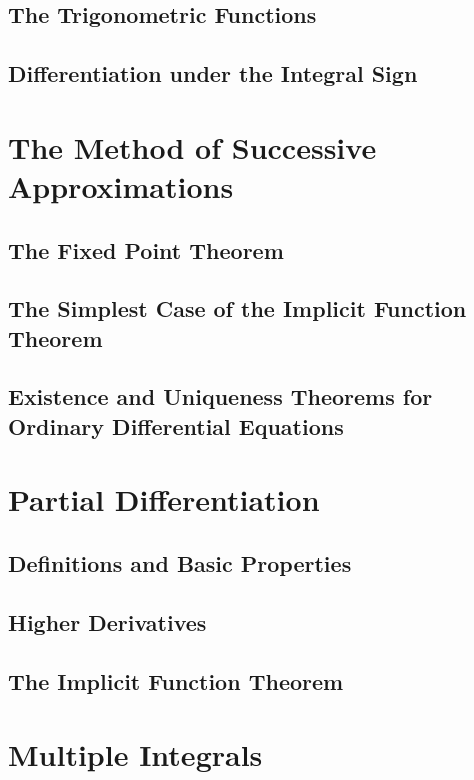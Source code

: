 \documentclass{article}
\begin{document}
		\subsection{The Trigonometric Functions}
		
		\subsection{Differentiation under the Integral Sign}
		
		
	\section{The Method of Successive Approximations}
		\subsection{The Fixed Point Theorem}
		
		\subsection{The Simplest Case of the Implicit Function Theorem}
		
		\subsection{Existence and Uniqueness Theorems for Ordinary Differential Equations}
	
	
	\section{Partial Differentiation}
		\subsection{Definitions and Basic Properties}
		
		\subsection{Higher Derivatives}
		
		\subsection{The Implicit Function Theorem}
	
	
	\section{Multiple Integrals}
\end{document}
